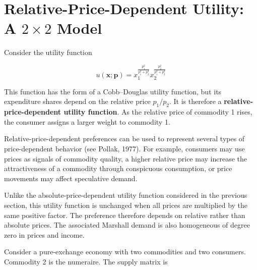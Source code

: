 \documentclass[
  letterpaper,
  DIV=11,
  numbers=noendperiod]{scrreprt}
\newenvironment{Shaded}{\begin{snugshade}}{\end{snugshade}}
\newcommand{\ConstantTok}[1]{\textcolor[rgb]{0.56,0.35,0.01}{#1}}
\newcommand{\FloatTok}[1]{\textcolor[rgb]{0.68,0.00,0.00}{#1}}
\newcommand{\FunctionTok}[1]{\textcolor[rgb]{0.28,0.35,0.67}{#1}}
\newcommand{\NormalTok}[1]{\textcolor[rgb]{0.00,0.23,0.31}{#1}}
\newcommand{\OperatorTok}[1]{\textcolor[rgb]{0.37,0.37,0.37}{#1}}
\newcommand{\StringTok}[1]{\textcolor[rgb]{0.13,0.47,0.30}{#1}}
\begin{document}
%

\section{\texorpdfstring{Relative-Price-Dependent Utility: A
\(2\times2\)
Model}{Relative-Price-Dependent Utility: A 2\textbackslash times2 Model}}\label{relative-price-dependent-utility-a-2times2-model}

Consider the utility function

\[
u(\mathbf x;\mathbf p)
=
x_1^{\frac{p_1^2}{p_1^2+p_2^2}}
x_2^{\frac{p_2^2}{p_1^2+p_2^2}}
\]

This function has the form of a Cobb--Douglas utility function, but its
expenditure shares depend on the relative price \(p_1/p_2\). It is
therefore a \textbf{relative-price-dependent utility function}. As the
relative price of commodity 1 rises, the consumer assigns a larger
weight to commodity 1.

Relative-price-dependent preferences can be used to represent several
types of price-dependent behavior (see Pollak, 1977). For example,
consumers may use prices as signals of commodity quality, a higher
relative price may increase the attractiveness of a commodity through
conspicuous consumption, or price movements may affect speculative
demand.

Unlike the absolute-price-dependent utility function considered in the
previous section, this utility function is unchanged when all prices are
multiplied by the same positive factor. The preference therefore depends
on relative rather than absolute prices. The associated Marshall demand
is also homogeneous of degree zero in prices and income.

Consider a pure-exchange economy with two commodities and two consumers.
Commodity 2 is the numeraire. The supply matrix is
\end{document}
